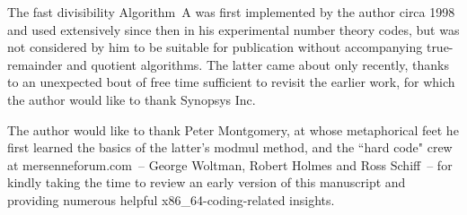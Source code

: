 \documentclass{article}
\begin{document}
The fast divisibility Algorithm~A was first implemented by the author circa 1998 and used extensively since then in his experimental number theory codes, but was not considered by him to be suitable for publication without accompanying true-remainder and quotient algorithms. The latter came about only recently, thanks to an unexpected bout of free time sufficient to revisit the earlier work, for which the author would like to thank Synopsys Inc.

The author would like to thank Peter Montgomery, at whose metaphorical feet he first learned the basics of the latter's modmul method, and the ``hard code" crew at mersenneforum.com~-- George Woltman, Robert Holmes and Ross Schiff~-- for kindly taking the time to review an early version of this manuscript and providing numerous helpful x86\_64-coding-related insights.



\end{document}
